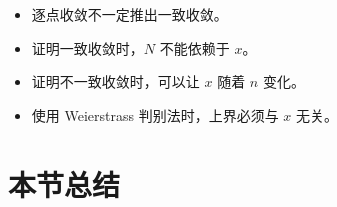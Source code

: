 \documentclass[12pt,a4paper]{ctexart}
\begin{document}
\begin{mistakebox}
\begin{itemize}
  \item 逐点收敛不一定推出一致收敛。
  \item 证明一致收敛时，$N$ 不能依赖于 $x$。
  \item 证明不一致收敛时，可以让 $x$ 随着 $n$ 变化。
  \item 使用 Weierstrass 判别法时，上界必须与 $x$ 无关。
\end{itemize}
\end{mistakebox}

\section{本节总结}

\begin{keybox}[总结]

\end{keybox}
\end{document}
